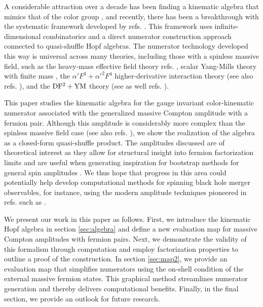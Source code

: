 \documentclass[a4paper,12pt]{article}
\begin{document}
A considerable attraction over a decade has been finding a kinematic algebra that mimics that of the color group \cite{Bern:2011ia,Monteiro:2011pc,Bjerrum-Bohr:2012kaa}, and recently, there has been a breakthrough with the systematic framework developed by refs. \cite{Chen:2019ywi, Chen:2021chy, Brandhuber:2021kpo}. This framework uses infinite-dimensional combinatorics \cite{Brandhuber:2021bsf, Brandhuber:2022enp} and a direct numerator construction approach connected to quasi-shuffle Hopf algebras. The numerator technology developed this way is universal across many theories, including those with a spinless massive field, such as the heavy-mass effective field theory refs. \cite{Georgi:1990um, Luke:1992cs, Neubert:1993mb, Manohar:2000dt, Damgaard:2019lfh,Brandhuber:2021kpo, Brandhuber:2021eyq}, scalar Yang-Mills theory with finite mass \cite{Chen:2022nei, Cao:2022vou}, the $\alpha'F^3+\alpha'^2F^4$ higher-derivative interaction theory \cite{Chen:2023ekh} (see also refs. \cite{Garozzo:2018uzj, Chen:2022shl,Pavao:2022kog,Carrasco:2022sck,Chen:2023dcx,Li:2023wdm,Bonnefoy:2023imz,Brown:2023srz,Carrasco:2021ptp,Carrasco:2022jxn,Garozzo:2024myw}), and the $\rm DF^2+YM$ theory \cite{Chen:2024gkj} (see as well refs. \cite{Huang:2016tag,Johansson:2017srf,Azevedo:2018dgo}).

This paper studies the kinematic algebra for the gauge invariant color-kinematic numerator associated with the generalized massive Compton amplitude with a fermion pair. Although this amplitude is considerably more complex than the spinless massive field case (see also refs. \cite{Bjerrum-Bohr:2019nws,Bjerrum-Bohr:2020syg,Edison:2020ehu,Lin:2022jrp}), we show the realization of the algebra as a closed-form quasi-shuffle product. The amplitudes discussed are of theoretical interest as they allow for structural insight into fermion factorization limits and are useful when generating inspiration for bootstrap methods for general spin amplitudes \cite{Bjerrum-Bohr:2023jau,Bjerrum-Bohr:2023iey}. We thus hope that progress in this area could potentially help develop computational methods for spinning black hole merger observables, for instance, using the modern amplitude techniques pioneered in refs. such as \cite{Bjerrum-Bohr:2013bxa,Bjerrum-Bohr:2018xdl,Cheung:2018wkq,Bern:2019nnu,Bjerrum-Bohr:2021din,Brandhuber:2021eyq, Bjerrum-Bohr:2021wwt,Bjerrum-Bohr:2022ows}.

We present our work in this paper as follows. First, we introduce the kinematic Hopf algebra in section \ref{sec:algebra} and define a new evaluation map for massive Compton amplitudes with fermion pairs. Next, we demonstrate the validity of this formalism through computation and employ factorization properties to outline a proof of the construction.
In section \ref{sec:map2}, we provide an evaluation map that simplifies numerators using the on-shell condition of the external massive fermion states. This graphical method streamlines numerator generation and thereby delivers computational benefits.
Finally, in the final section, we provide an outlook for future research.
%
\end{document}
